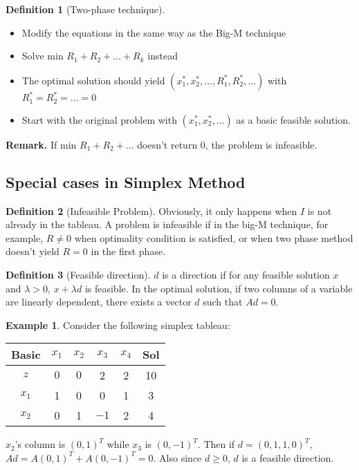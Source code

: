 \documentclass{article}
\theoremstyle{definition}
\newtheorem{definition}{Definition}[section]
\newtheorem{example}{Example}[section]
\begin{document}
	\begin{definition}[Two-phase technique]\hfill
	    \begin{itemize}
	        \item Modify the equations in the same way as the Big-M technique
	        \item Solve min $R_1+R_2 + \dots + R_k$ instead
	        \item The optimal solution should yield $(x_1^*, x_2^*, \dots, R_1^*, R_2^*, \dots)$ with $R_1^*=R_2^*=\dots=0$
	        \item Start with the original problem with $(x_1^*, x_2^*, \dots)$ as a basic feasible solution.
	   \end{itemize}
        \textbf{Remark.} If min $R_1+R_2 + \dots$ doesn't return 0, the problem is infeasible.
	\end{definition}

	\subsection{Special cases in Simplex Method}
	\begin{definition}[Infeasible Problem]\hfill\break
		Obviously, it only happens when $I$ is not already in the tableau. A problem is infeasible if in the big-M technique, for example, $R \neq 0$ when optimality condition is satisfied, or when two phase method doesn't yield $R = 0$ in the first phase.
	\end{definition}

	\begin{definition}[Feasible direction]\hfill\break
		$d$ is a direction if for any feasible solution $x$ and $\lambda > 0$, $x+\lambda d$ is feasible. In the optimal solution, if two columns of a variable are linearly dependent, there exists a vector $d$ such that $Ad = 0$.
	\end{definition}

	\begin{example}\hfill\break
		Consider the following simplex tableau:\\
		\begin{tabular}{ | c | c | c | c | c | c | } 
			\hline
			Basic & $x_1$ & $x_2$ & $x_3$ & $x_4$ & Sol \\
			\hline
			$z$ & $0$ & $0$ & 2 & 2 & 10 \\
			\hline
			$x_1$ & 1 & 0 & 0 & 1 & 3 \\ 
			\hline
			$x_2$ & 0 & 1 & $-1$ & 2 & 4 \\ 
			\hline
		\end{tabular}\break\break
	$x_2$'s column is $(0,1)^T$ while $x_3$ is $(0,-1)^T$. Then if $d = (0, 1, 1, 0)^T$, $Ad = A(0, 1)^T + A(0, -1)^T = 0$. Also since $d \geq 0$, $d$ is a feasible direction.
	\end{example}
\end{document}
